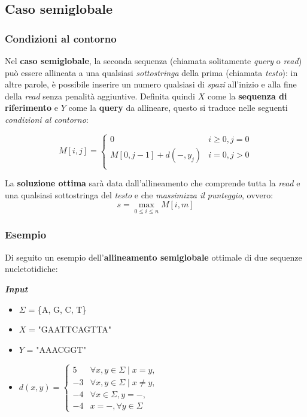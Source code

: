 \raggedright
\subsection{Caso semiglobale}
\subsubsection{Condizioni al contorno}

    Nel \textbf{caso semiglobale}, la seconda sequenza (chiamata solitamente \emph{query} o \emph{read}) può essere allineata a una qualsiasi \emph{sottostringa} della prima (chiamata \emph{testo}): in altre parole, è possibile inserire un numero qualsiasi di \emph{spazi} all'inizio e alla fine della \emph{read} senza penalità aggiuntive. Definita quindi $X$ come la \textbf{sequenza di riferimento} e $Y$ come la \textbf{query} da allineare, questo si traduce nelle seguenti \emph{condizioni al contorno}:

    \begin{equation}
        M[i, j] = \begin{cases}
            0 & i \geq 0, j = 0 \\
            M[0, j - 1] + d(-, y_j) & i = 0, j > 0 \\
        \end{cases}
    \end{equation}

    La \textbf{soluzione ottima} sarà data dall'allineamento che comprende tutta la \emph{read} e una qualsiasi sottostringa del \emph{testo} e che \emph{massimizza il punteggio}, ovvero: 
    \begin{equation}
        s = \max_{0 \leq i \leq n} M[i, m]
    \end{equation}
    
\subsubsection{Esempio}
    Di seguito un esempio dell'\textbf{allineamento semiglobale} ottimale di due sequenze nucletotidiche:

    \vspace{20pt}
    \noindent \textbf{\textit{Input}}
    \begin{itemize}
        \item $\Sigma$ = \{A, G, C, T\} 
        \item $X$ = "GAATTCAGTTA"
        \item $Y$ = "AAACGGT"
        \item $d(x, y) = \begin{cases}
            5 & \forall x, y \in \Sigma \mid x = y, \\
            -3 & \forall x, y \in \Sigma \mid x \neq y, \\
            -4 & \forall x \in \Sigma, y = -, \\
            -4 & x = -, \forall y \in \Sigma
        \end{cases}$
    \end{itemize}

